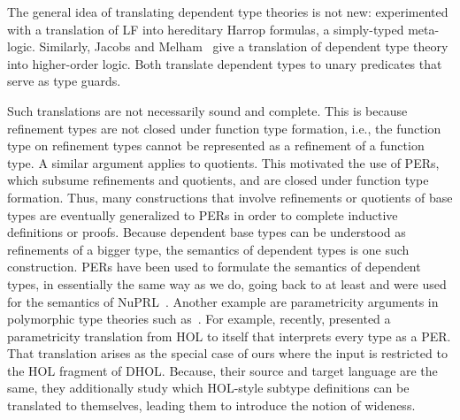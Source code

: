 The general idea of translating dependent type theories is not new: \cite{FM90} experimented with a translation of
LF into hereditary Harrop formulas, a simply-typed meta-logic.
Similarly, Jacobs and Melham~\cite{jacobs_dtt_hol} give a translation of dependent type theory into higher-order logic.
Both translate dependent types to unary predicates that serve as type guards.


Such translations are not necessarily sound and complete.
This is because refinement types are not closed under function type formation, i.e., the function type on refinement types cannot be represented as a refinement of a function type.
A similar argument applies to quotients.
This motivated the use of PERs, which subsume refinements and quotients, and are closed under function type formation.
Thus, many constructions that involve refinements or quotients of base types are eventually generalized to PERs in order to complete inductive definitions or proofs.
%
Because dependent base types can be understood as refinements of a bigger type, the semantics of dependent types is one such construction.
PERs have been used to formulate the semantics of dependent types, in essentially the same way as we do, going back to at least \cite{persemantics} and were used for the semantics of NuPRL~\cite{nuprlpers}.
Another example are parametricity arguments in polymorphic type theories such as~\cite{BJP10}.
For example, recently, \cite{hol_pers} presented a parametricity translation from HOL to itself that interprets every type as a PER.
That translation arises as the special case of ours where the input is restricted to the HOL fragment of DHOL.
Because, their source and target language are the same, they additionally study which HOL-style subtype definitions can be translated to themselves, leading them to introduce the notion of wideness.\\[-6mm]

